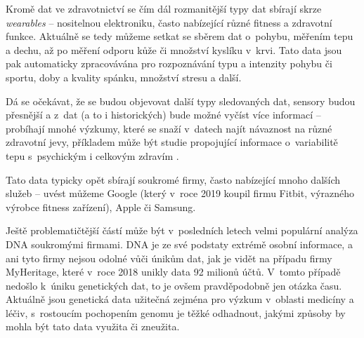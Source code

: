 Kromě dat ve zdravotnictví se čím dál rozmanitější typy dat sbírají skrze \textit{wearables} -- nositelnou elektroniku, často nabízející různé fitness a zdravotní funkce. Aktuálně se tedy můžeme setkat se sběrem dat o~pohybu, měřením tepu a dechu, až po měření odporu kůže či množství kyslíku v~krvi.
Tato data jsou pak automaticky zpracovávána pro rozpoznávání typu a intenzity pohybu či sportu, doby a kvality spánku, množství stresu a další.

Dá se očekávat, že se budou objevovat další typy sledovaných dat, sensory budou přesnější a z~dat (a to i historických) bude možné vyčíst více informací -- probíhají mnohé výzkumy, které se snaží v~datech najít návaznost na různé zdravotní jevy, příkladem může být studie propojující informace o~variabilitě tepu s~psychickým i celkovým zdravím \citep{heart-rate-health}.

Tato data typicky opět sbírají soukromé firmy, často nabízející mnoho dalších služeb -- uvést můžeme Google (který v~roce 2019 koupil firmu Fitbit, výrazného výrobce fitness zařízení), Apple či Samsung.

Ještě problematičtější částí může být v~posledních letech velmi populární analýza DNA soukromými firmami. DNA je ze své podstaty extrémě osobní informace, a ani tyto firmy nejsou odolné vůči únikům dat, jak je vidět na případu firmy MyHeritage, které v~roce 2018 unikly data 92 milionů účtů. V~tomto případě nedošlo k~úniku genetických dat, to je ovšem pravděpodobně jen otázka času. Aktuálně jsou genetická data užitečná zejména pro výzkum v~oblasti medicíny a léčiv, s~rostoucím pochopením genomu je těžké odhadnout, jakými způsoby by mohla být tato data využita či zneužita.

